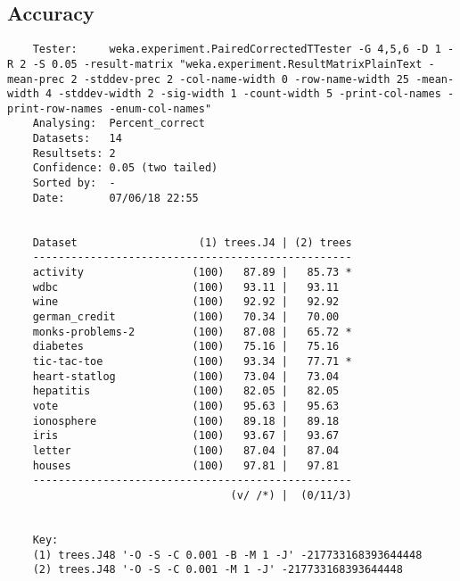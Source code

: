\subsection{Accuracy}
\begin{verbatim}
    Tester:     weka.experiment.PairedCorrectedTTester -G 4,5,6 -D 1 -R 2 -S 0.05 -result-matrix "weka.experiment.ResultMatrixPlainText -mean-prec 2 -stddev-prec 2 -col-name-width 0 -row-name-width 25 -mean-width 4 -stddev-width 2 -sig-width 1 -count-width 5 -print-col-names -print-row-names -enum-col-names"
    Analysing:  Percent_correct
    Datasets:   14
    Resultsets: 2
    Confidence: 0.05 (two tailed)
    Sorted by:  -
    Date:       07/06/18 22:55
    
    
    Dataset                   (1) trees.J4 | (2) trees
    --------------------------------------------------
    activity                 (100)   87.89 |   85.73 *
    wdbc                     (100)   93.11 |   93.11  
    wine                     (100)   92.92 |   92.92  
    german_credit            (100)   70.34 |   70.00  
    monks-problems-2         (100)   87.08 |   65.72 *
    diabetes                 (100)   75.16 |   75.16  
    tic-tac-toe              (100)   93.34 |   77.71 *
    heart-statlog            (100)   73.04 |   73.04  
    hepatitis                (100)   82.05 |   82.05  
    vote                     (100)   95.63 |   95.63  
    ionosphere               (100)   89.18 |   89.18  
    iris                     (100)   93.67 |   93.67  
    letter                   (100)   87.04 |   87.04  
    houses                   (100)   97.81 |   97.81  
    --------------------------------------------------
                                   (v/ /*) |  (0/11/3)
    
    
    Key:
    (1) trees.J48 '-O -S -C 0.001 -B -M 1 -J' -217733168393644448
    (2) trees.J48 '-O -S -C 0.001 -M 1 -J' -217733168393644448    
\end{verbatim}

